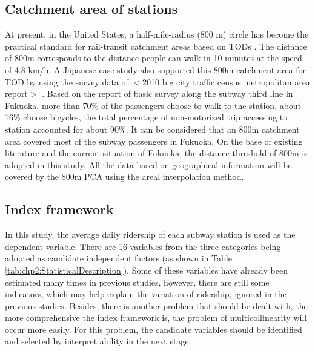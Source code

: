 \subsection{Catchment area of stations}
%
At present, in the United States, a half-mile-radius (800 m) circle has become the practical standard for rail-transit catchment areas based on TODs \cite{guerra2013half}. The distance of 800m corresponds to the distance people can walk in 10 minutes at the speed of 4.8 km/h. A Japanese case study also supported this 800m catchment area for TOD by using the survey data of $<$2010 big city traffic census metropolitan area report$>$ \cite{tadakatsu2015empirical}. Based on the report of basic survey along the subway third line in Fukuoka, more than 70\% of the passengers choose to walk to the station, about 16\% choose bicycles, the total percentage of non-motorized trip accessing to station accounted for about 90\%. It can be considered that an 800m catchment area covered most of the subway passengers in Fukuoka. On the base of existing literature and the current situation of Fukuoka, the distance threshold of 800m is adopted in this study. All the data based on geographical information will be covered by the 800m PCA using the areal interpolation method.

%
\subsection{Index framework}
%
In this study, the average daily ridership of each subway station is used as the dependent variable. There are 16 variables from the three categories being adopted as candidate independent factors (as shown in Table \ref{tab:chp2:StatisticalDescription}). Some of these variables have already been estimated many times in previous studies, however, there are still some indicators, which may help explain the variation of ridership, ignored in the previous studies. Besides, there is another problem that should be dealt with, the more comprehensive the index framework is, the problem of multicollinearity will occur more easily. For this problem, the candidate variables should be identified and selected by interpret ability in the next stage.

